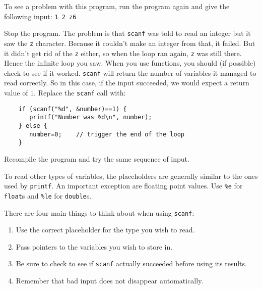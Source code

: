 To see a problem with this program, run the program again and give the following input:
\texttt{1 2 z6}

Stop the program.
The problem is that \texttt{scanf} was told to read an integer but it saw the \texttt{z} character.
Because it couldn't make an integer from that, it failed.
But it didn't get rid of the \texttt{z} either, so when the loop ran again, \texttt{z} was still there.
Hence the infinite loop you saw.
When you use functions, you should (if possible) check to see if it worked.
\texttt{scanf} will return the number of variables it managed to read correctly.
So in this case, if the input succeeded, we would expect a return value of $1$.
Replace the \texttt{scanf} call with:
\begin{lstlisting}
    if (scanf("%d", &number)==1) {
       printf("Number was %d\n", number); 
    } else {
       number=0;	// trigger the end of the loop
    }
\end{lstlisting}

Recompile the program and try the same sequence of input.

To read other types of variables, the placeholders are generally similar to the ones used by \texttt{printf}.
An important exception are floating point values.
Use \texttt{\%e} for \texttt{float}s and \texttt{\%le} for \texttt{double}s.


There are four main things to think about when using \texttt{scanf}:
\begin{enumerate}
 \item Use the correct placeholder for the type you wish to read.
 \item Pass pointers to the variables you wish to store in.
 \item Be sure to check to see if \texttt{scanf} actually succeeded
 before using its results.
 \item Remember that bad input does not disappear automatically.
\end{enumerate}
